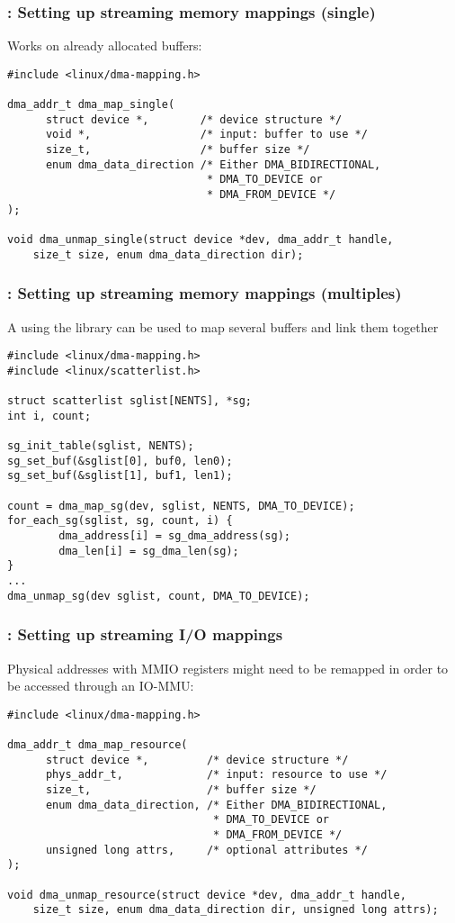 \begin{frame}[fragile]
  \frametitle{: Setting up streaming memory mappings (single)}
  Works on already allocated buffers:
  \vfill
\begin{verbatim}
#include <linux/dma-mapping.h>

dma_addr_t dma_map_single(
      struct device *,        /* device structure */
      void *,                 /* input: buffer to use */
      size_t,                 /* buffer size */
      enum dma_data_direction /* Either DMA_BIDIRECTIONAL,
                               * DMA_TO_DEVICE or
                               * DMA_FROM_DEVICE */
);

void dma_unmap_single(struct device *dev, dma_addr_t handle,
    size_t size, enum dma_data_direction dir);
\end{verbatim}
\end{frame}

\begin{frame}[fragile]
  \frametitle{: Setting up streaming memory mappings (multiples)}
  A  using the  library can be
  used to map several buffers and link them together
  \vfill
\begin{verbatim}
#include <linux/dma-mapping.h>
#include <linux/scatterlist.h>

struct scatterlist sglist[NENTS], *sg;
int i, count;

sg_init_table(sglist, NENTS);
sg_set_buf(&sglist[0], buf0, len0);
sg_set_buf(&sglist[1], buf1, len1);

count = dma_map_sg(dev, sglist, NENTS, DMA_TO_DEVICE);
for_each_sg(sglist, sg, count, i) {
        dma_address[i] = sg_dma_address(sg);
        dma_len[i] = sg_dma_len(sg);
}
...
dma_unmap_sg(dev sglist, count, DMA_TO_DEVICE);
\end{verbatim}
\end{frame}

\begin{frame}[fragile]
  \frametitle{: Setting up streaming I/O mappings}
  Physical addresses with MMIO registers might need to be remapped in order to
  be accessed through an IO-MMU:
  \vfill
\begin{verbatim}
#include <linux/dma-mapping.h>

dma_addr_t dma_map_resource(
      struct device *,         /* device structure */
      phys_addr_t,             /* input: resource to use */
      size_t,                  /* buffer size */
      enum dma_data_direction, /* Either DMA_BIDIRECTIONAL,
                                * DMA_TO_DEVICE or
                                * DMA_FROM_DEVICE */
      unsigned long attrs,     /* optional attributes */
);

void dma_unmap_resource(struct device *dev, dma_addr_t handle,
    size_t size, enum dma_data_direction dir, unsigned long attrs);
\end{verbatim}
\end{frame}


